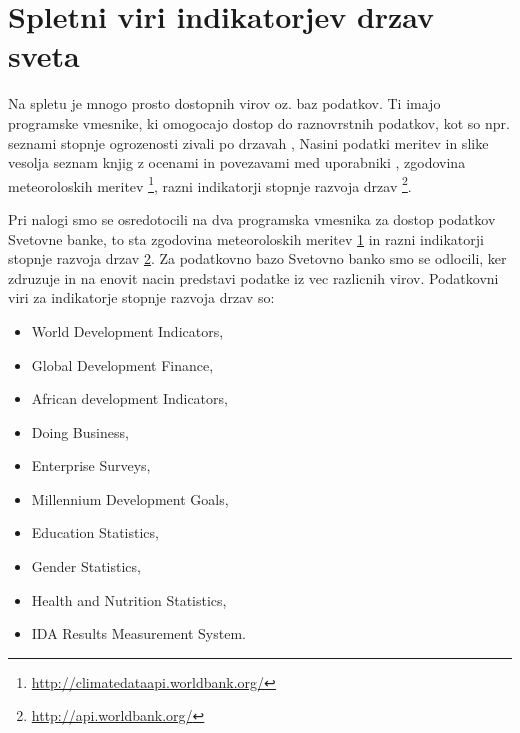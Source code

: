 \chapter{Spletni viri indikatorjev drzav sveta}

Na spletu je mnogo prosto dostopnih virov oz. baz podatkov. Ti imajo programske
vmesnike, ki omogocajo dostop do raznovrstnih podatkov, kot so npr. seznami 
stopnje ogrozenosti zivali po drzavah 
,
Nasini podatki meritev in slike vesolja
seznam knjig z ocenami in povezavami med uporabniki
,
zgodovina meteoroloskih meritev
\footnote{\label{climate_api}\url{http://climatedataapi.worldbank.org/}},
razni indikatorji stopnje razvoja drzav
\footnote{\label{indicator_api}\url{http://api.worldbank.org/}}.

Pri nalogi smo se osredotocili na dva programska vmesnika za dostop podatkov 
Svetovne banke, to sta zgodovina meteoroloskih meritev \ref{climate_api} in 
razni indikatorji stopnje razvoja drzav \ref{indicator_api}.
Za podatkovno bazo Svetovno banko smo se odlocili, ker zdruzuje in na enovit
nacin predstavi podatke iz vec razlicnih virov. Podatkovni viri za indikatorje
stopnje razvoja drzav so:

% 
% 
% 
% 



\begin{itemize}  
\item World Development Indicators, 
\item Global Development Finance, 
\item African development Indicators, 
\item Doing Business,
\item Enterprise Surveys, 
\item Millennium Development Goals, 
\item Education Statistics, 
\item Gender Statistics,
\item Health and Nutrition Statistics, 
\item IDA Results Measurement System.
\end{itemize}  

